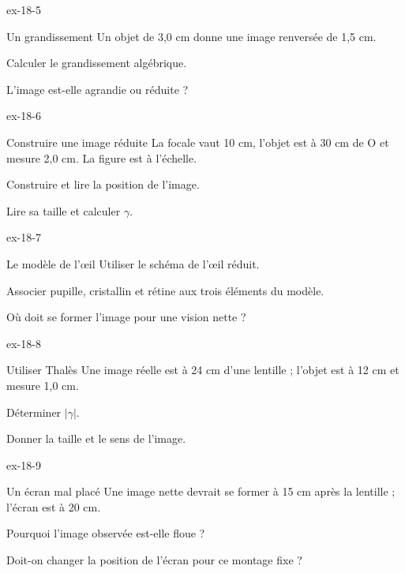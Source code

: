 \begin{blocLivre}{ex-18-5}\begin{exercice}[2]{Un grandissement}
Un objet de 3,0 cm donne une image renversée de 1,5 cm.
\begin{questions}
\item Calculer le grandissement algébrique.
\item L’image est-elle agrandie ou réduite ?
\end{questions}
\end{exercice}\end{blocLivre}
\begin{blocLivre}{ex-18-6}\begin{exercice}[2]{Construire une image réduite}
La focale vaut 10 cm, l’objet est à 30 cm de O et mesure 2,0 cm. La figure est à l’échelle.
\begin{questions}
\item Construire et lire la position de l’image.
\item Lire sa taille et calculer $\gamma$.
\end{questions}
\end{exercice}\end{blocLivre}
\begin{blocLivre}{ex-18-7}\begin{exercice}[2]{Le modèle de l’œil}
Utiliser le schéma de l’œil réduit.
\begin{questions}
\item Associer pupille, cristallin et rétine aux trois éléments du modèle.
\item Où doit se former l’image pour une vision nette ?
\end{questions}
\end{exercice}\end{blocLivre}
\begin{blocLivre}{ex-18-8}\begin{exercice}[2]{Utiliser Thalès}
Une image réelle est à 24 cm d’une lentille ; l’objet est à 12 cm et mesure 1,0 cm.
\begin{questions}
\item Déterminer $|\gamma|$.
\item Donner la taille et le sens de l’image.
\end{questions}
\end{exercice}\end{blocLivre}
\begin{blocLivre}{ex-18-9}\begin{exercice}[3]{Un écran mal placé}
Une image nette devrait se former à 15 cm après la lentille ; l’écran est à 20 cm.
\begin{questions}
\item Pourquoi l’image observée est-elle floue ?
\item Doit-on changer la position de l’écran pour ce montage fixe ?
\end{questions}
\end{exercice}\end{blocLivre}
